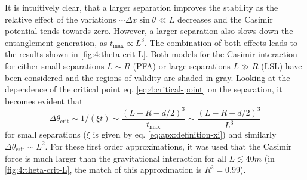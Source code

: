 It is intuitively clear, that a larger separation improves the stability as the relative effect of the variations $\sim \Delta x \sin\theta \ll L$ decreases and the Casimir potential tends towards zero.
However, a larger separation also slows down the entanglement generation, as $t_\mathrm{max} \propto L^3$.
The combination of both effects leads to the results shown in \cref{fig:4:theta-crit-L}.
Both models for the Casimir interaction for either small separations $L \sim R$ (PFA) or large separations $L \gg R$ (LSL) have been considered and the regions of validity are shaded in gray.
Looking at the dependence of the critical point eq. \eqref{eq:4:critical-point} on the separation, it becomes evident that
\begin{equation}
  \Delta \theta_\mathrm{crit} \sim 1/(\xi t) \sim \frac{(L - R - d/2)^3}{t_\mathrm{max}} \sim \frac{(L - R - d/2)^3}{L^3}
\end{equation}
for small separations ($\xi$ is given by eq. \eqref{eq:apx:definition-xi}) and similarly $\Delta \theta_\mathrm{crit} \sim L^2$.
For these first order approximations, it was used that the Casimir force is much larger than the gravitational interaction for all $L \lesssim 40\si{m}$ (in \cref{fig:4:theta-crit-L}, the match of this approximation is $R^2 = 0.99$).

